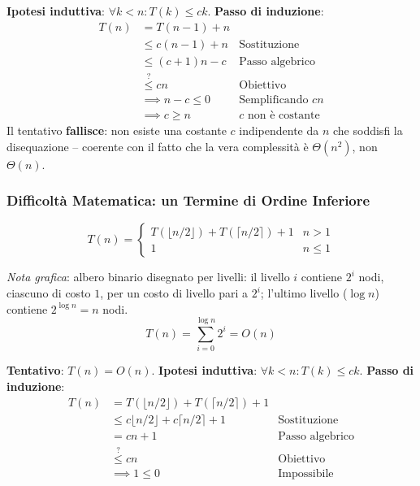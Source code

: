 \documentclass[12pt, a4paper]{article}
\begin{document}
\begin{tcolorbox}[colback=lightergray!10, colframe=tocsec, title=\textbf{Tentativo Sbagliato: $T(n)=O(n)$}]
\textbf{Ipotesi induttiva}: $\forall k<n: T(k)\le ck$. \textbf{Passo di induzione}:
\begin{align*}
T(n) &= T(n-1)+n \\
     &\le c(n-1)+n & \text{Sostituzione} \\
     &\le (c+1)n-c & \text{Passo algebrico} \\
     &\overset{?}{\le} cn & \text{Obiettivo} \\
     &\implies n-c\le 0 & \text{Semplificando } cn \\
     &\implies c\ge n & c \text{ non è costante}
\end{align*}
Il tentativo \textbf{fallisce}: non esiste una costante $c$ indipendente da $n$ che soddisfi la disequazione -- coerente con il fatto che la vera complessità è $\Theta(n^2)$, non $\Theta(n)$.
\end{tcolorbox}

\subsubsection{Difficoltà Matematica: un Termine di Ordine Inferiore}

$$T(n) = \begin{cases} T(\lfloor n/2\rfloor)+T(\lceil n/2\rceil)+1 & n>1 \\ 1 & n\le 1 \end{cases}$$

\textit{Nota grafica}: albero binario disegnato per livelli: il livello $i$ contiene $2^i$ nodi, ciascuno di costo $1$, per un costo di livello pari a $2^i$; l'ultimo livello ($\log n$) contiene $2^{\log n}=n$ nodi.
$$T(n) = \sum_{i=0}^{\log n} 2^i = O(n)$$

\begin{tcolorbox}[colback=lightergray!10, colframe=tocsec, title=\textbf{Il Tentativo Diretto Fallisce}]
\textbf{Tentativo}: $T(n)=O(n)$. \textbf{Ipotesi induttiva}: $\forall k<n: T(k)\le ck$. \textbf{Passo di induzione}:
\begin{align*}
T(n) &= T(\lfloor n/2\rfloor)+T(\lceil n/2\rceil)+1 \\
     &\le c\lfloor n/2\rfloor + c\lceil n/2\rceil + 1 & \text{Sostituzione} \\
     &= cn+1 & \text{Passo algebrico} \\
     &\overset{?}{\le} cn & \text{Obiettivo} \\
     &\implies 1\le 0 & \text{Impossibile}
\end{align*}
\end{tcolorbox}
\end{document}
